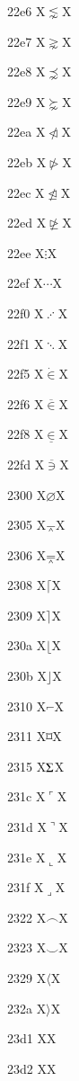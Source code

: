 \documentclass[11pt]{article}
\begin{document}
22e6 X{\ensuremath{\lnsim}}X

22e7 X{\ensuremath{\gnsim}}X

22e8 X{\ensuremath{\precnsim}}X

22e9 X{\ensuremath{\succnsim}}X

22ea X{\ensuremath{\ntriangleleft}}X

22eb X{\ensuremath{\ntriangleright}}X

22ec X{\ensuremath{\ntrianglelefteq}}X

22ed X{\ensuremath{\ntrianglerighteq}}X

22ee X{\ensuremath{\vdots}}X

22ef X{\ensuremath{\cdots}}X

22f0 X{\ensuremath{\iddots}}X

22f1 X{\ensuremath{\ddots}}X

22f5 X{\ensuremath{\dot{\in}}}X

22f6 X{\ensuremath{\overline{\in}}}X

22f8 X{\ensuremath{\underline{\in}}}X

22fd X{\ensuremath{\overline{\ni}}}X

2300 X{\ensuremath{\diameter}}X

2305 X{\ensuremath{\barwedge}}X

2306 X{\ensuremath{\doublebarwedge}}X

2308 X{\ensuremath{\lceil}}X

2309 X{\ensuremath{\rceil}}X

230a X{\ensuremath{\lfloor}}X

230b X{\ensuremath{\rfloor}}X

2310 X{\ensuremath{\invneg}}X

2311 X{\ensuremath{\wasylozenge}}X

2315 X{\ensuremath{\recorder}}X

231c X{\ensuremath{\ulcorner}}X

231d X{\ensuremath{\urcorner}}X

231e X{\ensuremath{\llcorner}}X

231f X{\ensuremath{\lrcorner}}X

2322 X{\ensuremath{\frown}}X

2323 X{\ensuremath{\smile}}X

2329 X{\ensuremath{\langle}}X

232a X{\ensuremath{\rangle}}X

23d1 X{\metra{\b}}X

23d2 X{\metra{\mb}}X
\end{document}
